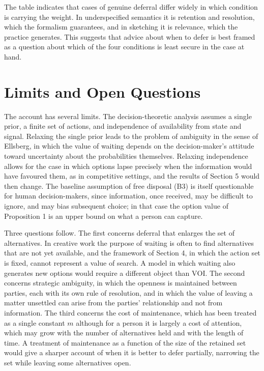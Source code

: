 \documentclass[11pt]{article}
\theoremstyle{remark}
\begin{document}
The table indicates that cases of genuine deferral differ widely in which condition is carrying the weight. In underspecified semantics it is retention and resolution, which the formalism guarantees, and in sketching it is relevance, which the practice generates. This suggests that advice about when to defer is best framed as a question about which of the four conditions is least secure in the case at hand.

\section{Limits and Open Questions}

The account has several limits. The decision-theoretic analysis assumes a single prior, a finite set of actions, and independence of availability from state and signal. Relaxing the single prior leads to the problem of ambiguity in the sense of Ellsberg, in which the value of waiting depends on the decision-maker's attitude toward uncertainty about the probabilities themselves. Relaxing independence allows for the case in which options lapse precisely when the information would have favoured them, as in competitive settings, and the results of Section 5 would then change. The baseline assumption of free disposal (B3) is itself questionable for human decision-makers, since information, once received, may be difficult to ignore, and may bias subsequent choice; in that case the option value of Proposition 1 is an upper bound on what a person can capture.

Three questions follow. The first concerns deferral that enlarges the set of alternatives. In creative work the purpose of waiting is often to find alternatives that are not yet available, and the framework of Section 4, in which the action set is fixed, cannot represent a value of search. A model in which waiting also generates new options would require a different object than $\mathrm{VOI}$. The second concerns strategic ambiguity, in which the openness is maintained between parties, each with its own rule of resolution, and in which the value of leaving a matter unsettled can arise from the parties' relationship and not from information. The third concerns the cost of maintenance, which has been treated as a single constant $m$ although for a person it is largely a cost of attention, which may grow with the number of alternatives held and with the length of time. A treatment of maintenance as a function of the size of the retained set would give a sharper account of when it is better to defer partially, narrowing the set while leaving some alternatives open.
\end{document}
